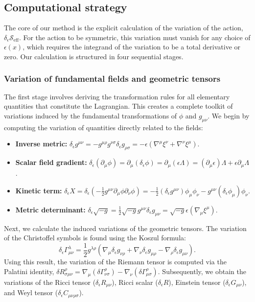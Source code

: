 \documentclass[twocolumn]{aastex631}
\begin{document}
\subsection{Computational strategy}

The core of our method is the explicit calculation of the variation of the action, $\delta_\epsilon \mathcal{S}_{\text{eff}}$. For the action to be symmetric, this variation must vanish for any choice of $\epsilon(x)$, which requires the integrand of the variation to be a total derivative or zero. Our calculation is structured in four sequential stages.

\subsubsection{Variation of fundamental fields and geometric tensors}
The first stage involves deriving the transformation rules for all elementary quantities that constitute the Lagrangian. This creates a complete toolkit of variations induced by the fundamental transformations of $\phi$ and $g_{\mu\nu}$. We begin by computing the variation of quantities directly related to the fields:
\begin{itemize}
    \item \textbf{Inverse metric:} $\delta_\epsilon g^{\mu\nu} = -g^{\mu\rho}g^{\nu\sigma}\delta_\epsilon g_{\rho\sigma} = -\epsilon(\nabla^\mu\xi^\nu + \nabla^\nu\xi^\mu)$.
    \item \textbf{Scalar field gradient:} $\delta_\epsilon(\partial_\mu \phi) = \partial_\mu(\delta_\epsilon \phi) = \partial_\mu(\epsilon\Lambda) = (\partial_\mu\epsilon)\Lambda + \epsilon\partial_\mu\Lambda$.
    \item \textbf{Kinetic term:} $\delta_\epsilon X = \delta_\epsilon(-\frac{1}{2}g^{\mu\nu}\partial_\mu\phi\partial_\nu\phi) = -\frac{1}{2}(\delta_\epsilon g^{\mu\nu})\phi_\mu\phi_\nu - g^{\mu\nu}(\delta_\epsilon\phi_\mu)\phi_\nu$.
    \item \textbf{Metric determinant:} $\delta_\epsilon \sqrt{-g} = \frac{1}{2}\sqrt{-g}g^{\mu\nu}\delta_\epsilon g_{\mu\nu} = \sqrt{-g} \epsilon (\nabla_\mu \xi^\mu)$.
\end{itemize}
Next, we calculate the induced variations of the geometric tensors. The variation of the Christoffel symbols is found using the Koszul formula:
\begin{equation}
    \delta_\epsilon \Gamma^\lambda_{\mu\nu} = \frac{1}{2} g^{\lambda\rho} (\nabla_\mu \delta_\epsilon g_{\nu\rho} + \nabla_\nu \delta_\epsilon g_{\mu\rho} - \nabla_\rho \delta_\epsilon g_{\mu\nu}).
\end{equation}
Using this result, the variation of the Riemann tensor is computed via the Palatini identity, $\delta R^\rho_{\sigma\mu\nu} = \nabla_\mu(\delta \Gamma^\rho_{\nu\sigma}) - \nabla_\nu(\delta \Gamma^\rho_{\mu\sigma})$. Subsequently, we obtain the variations of the Ricci tensor ($\delta_\epsilon R_{\mu\nu}$), Ricci scalar ($\delta_\epsilon R$), Einstein tensor ($\delta_\epsilon G_{\mu\nu}$), and Weyl tensor ($\delta_\epsilon C_{\mu\nu\rho\sigma}$).
\end{document}
